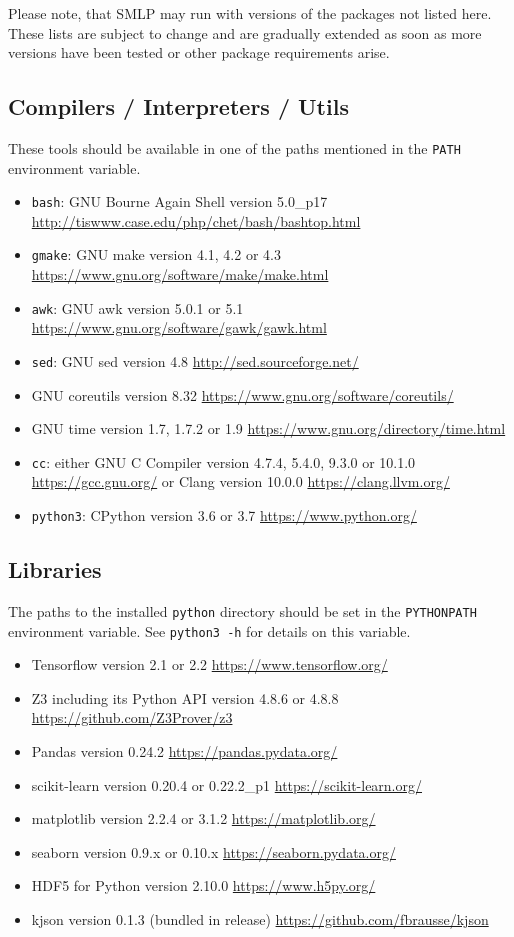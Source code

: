 \documentclass[a4paper,parskip=half]{article} %
\newcommand*\cmdstyle\texttt
\newcommand*\cmd[1]{\cmdstyle{\textcolor{red!85!black}{#1}}}
\newcommand*\SolverAbbrvText{SMLP}
\newcommand*\SolverAbbrv{\SolverAbbrvText\xspace}
\begin{document}
Please note, that \SolverAbbrv may run with versions of the packages not listed
here. These lists are subject to change and are gradually extended as soon as
more versions have been tested or other package requirements arise.

\subsection{Compilers / Interpreters / Utils}\label{list:comp-int}
These tools should be available in one of the paths
mentioned in the \texttt{PATH} environment variable.
\begin{itemize}
\item \cmd{bash}: GNU Bourne Again Shell version 5.0\_p17
	\url{http://tiswww.case.edu/php/chet/bash/bashtop.html}
\item \cmd{gmake}: GNU make version 4.1, 4.2 or 4.3
	\url{https://www.gnu.org/software/make/make.html}
\item \cmd{awk}: GNU awk version 5.0.1 or 5.1
	\url{https://www.gnu.org/software/gawk/gawk.html}
\item \cmd{sed}: GNU sed version 4.8
	\url{http://sed.sourceforge.net/}
\item GNU coreutils version 8.32
	\url{https://www.gnu.org/software/coreutils/}
\item GNU time version 1.7, 1.7.2 or 1.9
	\url{https://www.gnu.org/directory/time.html}
\item \cmd{cc}: either GNU C Compiler version 4.7.4, 5.4.0, 9.3.0 or 10.1.0
	\url{https://gcc.gnu.org/}
	or Clang version 10.0.0
	\url{https://clang.llvm.org/}
\item \cmd{python3}: CPython version 3.6 or 3.7
	\url{https://www.python.org/}
\end{itemize}

\subsection{Libraries}\label{list:libs}
The paths to the installed \texttt{python} directory should be set in the
\texttt{PYTHONPATH} environment variable. See \cmd{python3 -h} for details on
this variable.
\begin{itemize}
\item Tensorflow version 2.1 or 2.2 \url{https://www.tensorflow.org/}
\item Z3 including its Python API version 4.8.6 or 4.8.8
	\url{https://github.com/Z3Prover/z3}
\item Pandas version 0.24.2 \url{https://pandas.pydata.org/}
\item scikit-learn version 0.20.4 or 0.22.2\_p1
	\url{https://scikit-learn.org/}
\item matplotlib version 2.2.4 or 3.1.2
	\url{https://matplotlib.org/}
\item seaborn version 0.9.x or 0.10.x
	\url{https://seaborn.pydata.org/}
\item HDF5 for Python version 2.10.0
	\url{https://www.h5py.org/}
\item kjson version 0.1.3 (bundled in release)
	\url{https://github.com/fbrausse/kjson}
\end{itemize}
\end{document}
